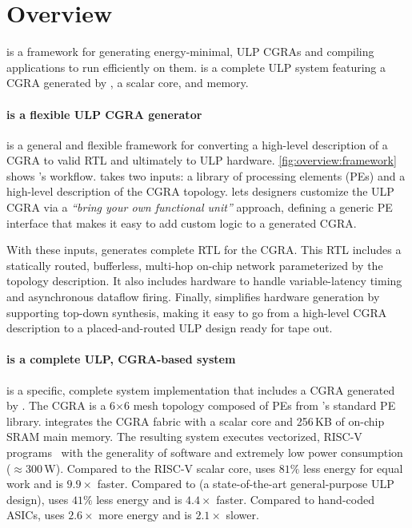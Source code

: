 \figSNAFUOverviewFramework
\figSNAFUOverviewExecute
\section{Overview}
\label{snafu:overview}

\snafuframe is a framework for generating energy-minimal, ULP CGRAs
and compiling applications to run efficiently on them.
%
\snafuarch is a complete ULP system featuring a CGRA generated by \snafuframe,
a scalar core, and memory.

\paragraph{\snafuframe is a flexible ULP CGRA generator}
\snafuframe is a general and flexible framework for converting a high-level
description of a CGRA to valid RTL and ultimately to ULP hardware.
% 
\autoref{fig:overview:framework} shows \snafuframe's workflow.
% 
\snafuframe takes two inputs: a library of processing elements (PEs) and a high-level description of the CGRA topology.
% 
\snafuframe lets designers customize the ULP CGRA
%
via a {\em ``bring your own functional unit''} approach,
defining a generic PE interface that makes it easy to add custom logic to a generated CGRA.

With these inputs, \snafuframe generates complete RTL for the CGRA.
% 
This RTL includes a statically routed, bufferless, multi-hop on-chip network parameterized by the topology description.
% 
It also includes hardware to handle variable-latency timing and asynchronous dataflow firing.
%
Finally, \snafuframe simplifies hardware generation by supporting top-down synthesis,
making it easy to go from a high-level CGRA description to a placed-and-routed ULP design ready for tape out.

\paragraph{\snafuarch is a complete ULP, CGRA-based system}
\snafuarch is a specific, complete system implementation that includes a CGRA generated by \snafuframe.
The CGRA is a 6$\times$6 mesh topology composed of PEs from \snafuframe's standard PE library.
%
\snafuarch integrates the CGRA fabric with a scalar core and 256\,KB of on-chip SRAM main memory.
%
The resulting system executes vectorized, RISC-V programs~\cite{riscv_2019}
with the generality of software and extremely low power consumption ($\approx$300\,\textmu W).  
% 
Compared to the \mbox{RISC-V} scalar core, \snafuarch uses $81\%$ less energy for equal work and is $9.9\times$ faster.
% 
Compared to \manic (a state-of-the-art general-purpose ULP design), \snafuarch uses $41\%$ less energy and is $4.4\times$ faster.
%
Compared to hand-coded ASICs, \snafuarch uses $2.6\times$ more energy and is $2.1\times$ slower.

